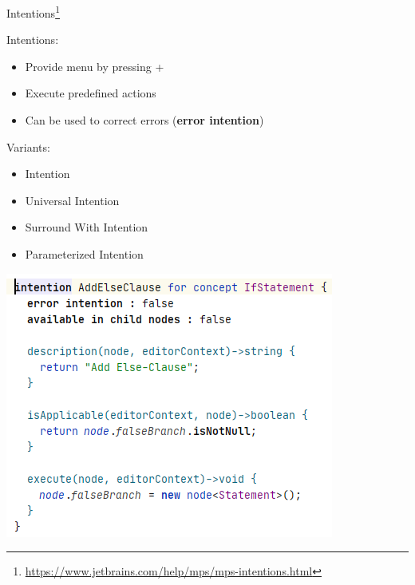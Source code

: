 	\begin{frame}{Intentions\footnote{\url{https://www.jetbrains.com/help/mps/mps-intentions.html}}}
		\begin{minipage}{0.52\textwidth}
			Intentions:
			\begin{itemize}
				\item Provide \menu{\workshopintention} menu by pressing +\menu{\return}
				\item Execute predefined actions
				\item Can be used to correct errors (\textbf{error intention})
			\end{itemize}
			Variants:
			\begin{itemize}
				\item Intention
				\item Universal Intention
				\item Surround With Intention
				\item Parameterized Intention
			\end{itemize}
		\end{minipage}
		\begin{minipage}{0.4\textwidth}
		\includegraphics[height=0.8\textheight]{illustrations/intention.png}
		\end{minipage}
	\end{frame}

